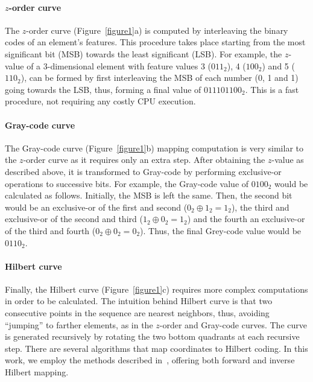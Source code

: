 \paragraph{$z$-order curve}
The $z$-order curve (Figure~\ref{figure1}a) is computed by interleaving the binary codes of an element's features. This procedure takes place starting from the most significant bit (MSB) towards the least significant (LSB). For example, the $z$-value of a 3-dimensional element with feature values 3 ($011_2$), 4 ($100_2$) and 5 ($110_2$), can be formed by first interleaving the MSB of each number (0, 1 and 1) going towards the LSB, thus, forming a final value of $011101100_2$. This is a fast procedure, not requiring any costly CPU execution.

\paragraph{Gray-code curve}
The Gray-code curve (Figure~\ref{figure1}b) mapping computation is very similar to the $z$-order curve as it requires only an extra step. After obtaining the $z$-value as described above, it is transformed to Gray-code by performing exclusive-or operations to successive bits. For example, the Gray-code value of $0100_2$ would be calculated as follows. Initially, the MSB is left the same. Then, the second bit would be an exclusive-or of the first and second ($0_2\oplus1_2=1_2$), the third and exclusive-or of the second and third ($1_2\oplus0_2=1_2$) and the fourth an exclusive-or of the third and fourth ($0_2\oplus0_2=0_2$). Thus, the final Grey-code value would be $0110_2$.

\paragraph{Hilbert curve}
Finally, the Hilbert curve (Figure~\ref{figure1}c) requires more complex computations in order to be calculated. The intuition behind Hilbert curve is that two consecutive points in the sequence are nearest neighbors, thus, avoiding ``jumping'' to farther elements, as in the $z$-order and Gray-code curves. The curve is generated recursively by rotating the two bottom quadrants at each recursive step. There are several algorithms that map coordinates to Hilbert coding. In this work, we employ the methods described in~\cite{lawder00calculationof}, offering both forward and inverse Hilbert mapping.

